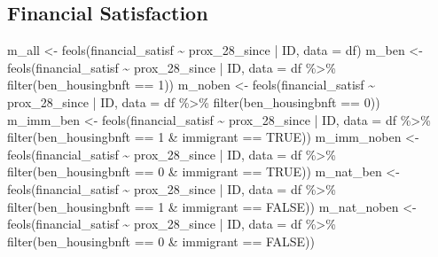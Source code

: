 \documentclass[
  letterpaper,
  DIV=11,
  numbers=noendperiod]{scrartcl}
\newenvironment{Shaded}{\begin{snugshade}}{\end{snugshade}}
\newcommand{\AttributeTok}[1]{\textcolor[rgb]{0.40,0.45,0.13}{#1}}
\newcommand{\ConstantTok}[1]{\textcolor[rgb]{0.56,0.35,0.01}{#1}}
\newcommand{\DecValTok}[1]{\textcolor[rgb]{0.68,0.00,0.00}{#1}}
\newcommand{\FunctionTok}[1]{\textcolor[rgb]{0.28,0.35,0.67}{#1}}
\newcommand{\NormalTok}[1]{\textcolor[rgb]{0.00,0.23,0.31}{#1}}
\newcommand{\OtherTok}[1]{\textcolor[rgb]{0.00,0.23,0.31}{#1}}
\newcommand{\SpecialCharTok}[1]{\textcolor[rgb]{0.37,0.37,0.37}{#1}}
\begin{document}
\hypertarget{financial-satisfaction-1}{%
\subsection{Financial Satisfaction}\label{financial-satisfaction-1}}

\begin{Shaded}
\begin{Highlighting}[]
\NormalTok{m\_all }\OtherTok{\textless{}{-}} \FunctionTok{feols}\NormalTok{(financial\_satisf }\SpecialCharTok{\textasciitilde{}}\NormalTok{ prox\_28\_since }\SpecialCharTok{|}\NormalTok{ ID, }\AttributeTok{data =}\NormalTok{ df)}
\NormalTok{m\_ben }\OtherTok{\textless{}{-}} \FunctionTok{feols}\NormalTok{(financial\_satisf }\SpecialCharTok{\textasciitilde{}}\NormalTok{ prox\_28\_since }\SpecialCharTok{|}\NormalTok{ ID,}
               \AttributeTok{data =}\NormalTok{ df }\SpecialCharTok{\%\textgreater{}\%} \FunctionTok{filter}\NormalTok{(ben\_housingbnft }\SpecialCharTok{==} \DecValTok{1}\NormalTok{))}
\NormalTok{m\_noben }\OtherTok{\textless{}{-}} \FunctionTok{feols}\NormalTok{(financial\_satisf }\SpecialCharTok{\textasciitilde{}}\NormalTok{ prox\_28\_since }\SpecialCharTok{|}\NormalTok{ ID,}
                 \AttributeTok{data =}\NormalTok{ df }\SpecialCharTok{\%\textgreater{}\%} \FunctionTok{filter}\NormalTok{(ben\_housingbnft }\SpecialCharTok{==} \DecValTok{0}\NormalTok{))}
\NormalTok{m\_imm\_ben }\OtherTok{\textless{}{-}} \FunctionTok{feols}\NormalTok{(financial\_satisf }\SpecialCharTok{\textasciitilde{}}\NormalTok{ prox\_28\_since }\SpecialCharTok{|}\NormalTok{ ID,}
                   \AttributeTok{data =}\NormalTok{ df }\SpecialCharTok{\%\textgreater{}\%} \FunctionTok{filter}\NormalTok{(ben\_housingbnft }\SpecialCharTok{==} \DecValTok{1} \SpecialCharTok{\&}\NormalTok{ immigrant }\SpecialCharTok{==} \ConstantTok{TRUE}\NormalTok{))}
\NormalTok{m\_imm\_noben }\OtherTok{\textless{}{-}} \FunctionTok{feols}\NormalTok{(financial\_satisf }\SpecialCharTok{\textasciitilde{}}\NormalTok{ prox\_28\_since }\SpecialCharTok{|}\NormalTok{ ID,}
                     \AttributeTok{data =}\NormalTok{ df }\SpecialCharTok{\%\textgreater{}\%} \FunctionTok{filter}\NormalTok{(ben\_housingbnft }\SpecialCharTok{==} \DecValTok{0} \SpecialCharTok{\&}\NormalTok{ immigrant }\SpecialCharTok{==} \ConstantTok{TRUE}\NormalTok{))}
\NormalTok{m\_nat\_ben }\OtherTok{\textless{}{-}} \FunctionTok{feols}\NormalTok{(financial\_satisf }\SpecialCharTok{\textasciitilde{}}\NormalTok{ prox\_28\_since }\SpecialCharTok{|}\NormalTok{ ID,}
                   \AttributeTok{data =}\NormalTok{ df }\SpecialCharTok{\%\textgreater{}\%} \FunctionTok{filter}\NormalTok{(ben\_housingbnft }\SpecialCharTok{==} \DecValTok{1} \SpecialCharTok{\&}\NormalTok{ immigrant }\SpecialCharTok{==} \ConstantTok{FALSE}\NormalTok{))}
\NormalTok{m\_nat\_noben }\OtherTok{\textless{}{-}} \FunctionTok{feols}\NormalTok{(financial\_satisf }\SpecialCharTok{\textasciitilde{}}\NormalTok{ prox\_28\_since }\SpecialCharTok{|}\NormalTok{ ID,}
                     \AttributeTok{data =}\NormalTok{ df }\SpecialCharTok{\%\textgreater{}\%} \FunctionTok{filter}\NormalTok{(ben\_housingbnft }\SpecialCharTok{==} \DecValTok{0} \SpecialCharTok{\&}\NormalTok{ immigrant }\SpecialCharTok{==} \ConstantTok{FALSE}\NormalTok{))}


\end{Highlighting}
\end{Shaded}
\end{document}
